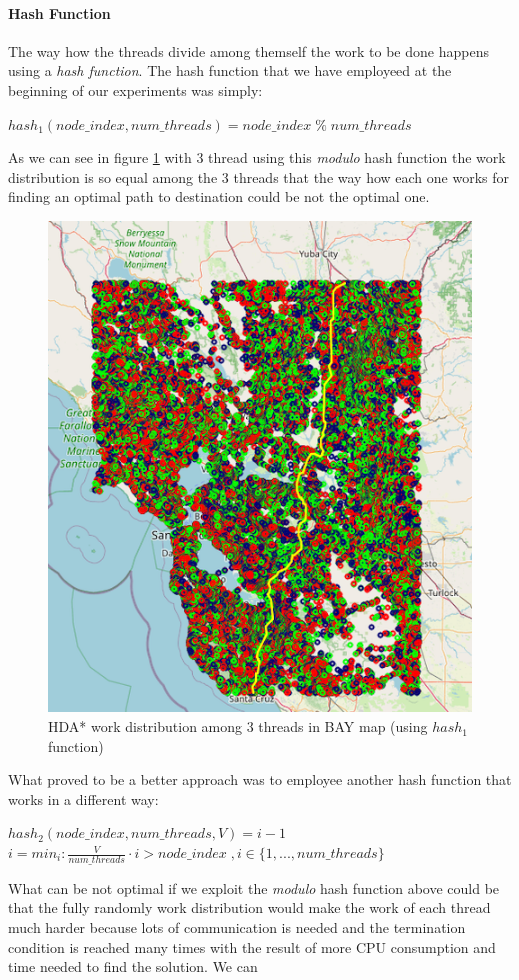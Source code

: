\documentclass[twocolumn, switch]{article} %
\begin{document}
\paragraph{Hash Function}
The way how the threads divide among themself the work to be done happens using
a \textit{hash function}. The hash function that we have employeed at the 
beginning of our experiments was simply:
\begin{center}
  $hash_1(node\_index, num\_threads) = node\_index \;\%\; num\_threads$
\end{center}
As we can see in figure \ref{hdawork1} with 3 thread using this \textit{modulo} hash
function the work distribution is so equal
among the 3 threads that the way how each one works for finding an optimal path
to destination could be not the optimal one.
\begin{figure}[ht!]
  \centering
  \small
  \includegraphics[width=0.5\linewidth]{hda/hda_work_BAY1.png}
  \caption{HDA* work distribution among 3 threads in BAY map (using $hash_1$ function)}
  \label{hdawork1}
\end{figure}
What proved to be a better approach was to employee another hash function that works in a different way:
\begin{center}
  $hash_2(node\_index, num\_threads, V) = i-1$\\[10pt]
  $i = min_i : \frac{V}{num\_threads}\cdot i > node\_index \;, i \in \{1,...,num\_threads\}$
\end{center}
What can be not optimal if we exploit the \textit{modulo} hash
function above could be that the fully randomly work distribution would make the work of each thread
much harder because lots of communication is needed and the termination condition is reached
many times with the result of more CPU consumption and time needed to find the solution. We can
\end{document}
